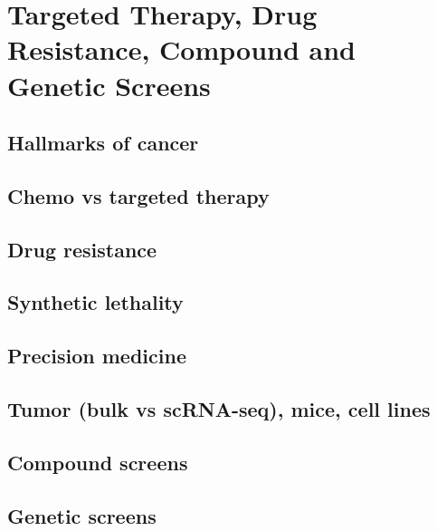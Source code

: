 \documentclass[
]{book}
\begin{document}
\hypertarget{tt}{%
\chapter{Targeted Therapy, Drug Resistance, Compound and Genetic Screens}\label{tt}}

\hypertarget{hallmarks-of-cancer}{%
\section{Hallmarks of cancer}\label{hallmarks-of-cancer}}

\hypertarget{chemo-vs-targeted-therapy}{%
\section{Chemo vs targeted therapy}\label{chemo-vs-targeted-therapy}}

\hypertarget{drug-resistance}{%
\section{Drug resistance}\label{drug-resistance}}

\hypertarget{synthetic-lethality}{%
\section{Synthetic lethality}\label{synthetic-lethality}}

\hypertarget{precision-medicine}{%
\section{Precision medicine}\label{precision-medicine}}

\hypertarget{tumor-bulk-vs-scrna-seq-mice-cell-lines}{%
\section{Tumor (bulk vs scRNA-seq), mice, cell lines}\label{tumor-bulk-vs-scrna-seq-mice-cell-lines}}

\hypertarget{compound-screens}{%
\section{Compound screens}\label{compound-screens}}

\hypertarget{genetic-screens}{%
\section{Genetic screens}\label{genetic-screens}}
\end{document}
